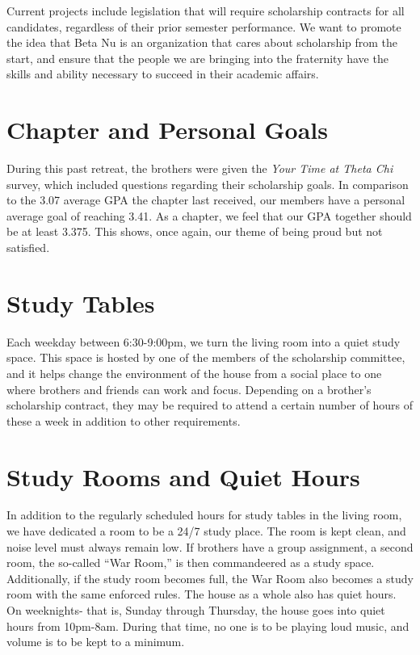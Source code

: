     Current projects include legislation that will require scholarship contracts for all candidates, regardless of their prior semester performance. We want to promote the idea that Beta Nu is an organization that cares about scholarship from the start, and ensure that the people we are bringing into the fraternity have the skills and ability necessary to succeed in their academic affairs.
    
  \section*{Chapter and Personal Goals}
    During this past retreat, the brothers were given the \textit{Your Time at Theta Chi} survey, which included questions regarding their scholarship goals. In comparison to the 3.07 average GPA the chapter last received, our members have a personal average goal of reaching 3.41. As a chapter, we feel that our GPA together should be at least 3.375. This shows, once again, our theme of being proud but not satisfied.
    
  \section*{Study Tables}
    Each weekday between 6:30-9:00pm, we turn the living room into a quiet study space. This space is hosted by one of the members of the scholarship committee, and it helps change the environment of the house from a social place to one where brothers and friends can work and focus. Depending on a brother's scholarship contract, they may be required to attend a certain number of hours of these a week in addition to other requirements. 
    
  \section*{Study Rooms and Quiet Hours}
    In addition to the regularly scheduled hours for study tables in the living room, we have dedicated a room to be a 24/7 study place. The room is kept clean, and noise level must always remain low. If brothers have a group assignment, a second room, the so-called “War Room,” is then commandeered as a study space. Additionally, if the study room becomes full, the War Room also becomes a study room with the same enforced rules.  The house as a whole also has quiet hours. On weeknights- that is, Sunday through Thursday, the house goes into quiet hours from 10pm-8am. During that time, no one is to be playing loud music, and volume is to be kept to a minimum.
    
